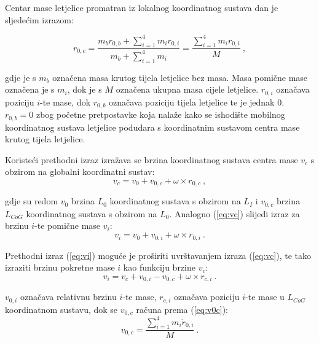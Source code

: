 \documentclass[11pt,a4paper]{article}
\begin{document}
\medskip

Centar mase letjelice promatran iz lokalnog koordinatnog sustava dan je sljedećim izrazom:

\begin{equation}
 {r}_{0,c} = \frac{ {m}_{b} {r}_{0,b} + \sum_{i=1}^{4}{m}_{i} {r}_{0,i}}{{m}_{b} + \sum_{i=1}^{4} {m}_{i}} = \frac{\sum_{i=1}^{4} {m}_{i} {r}_{0,i}}{ {M}} \ , 
\label{eq:r0c}
\end{equation}

\medskip

gdje je s $m_{b}$ označena masa krutog tijela letjelice bez masa. Masa pomične mase označena je s $m_{i}$, dok je s $M$ označena ukupna masa cijele letjelice. $r_{0,i}$ označava poziciju $i$-te mase, dok $r_{0,b}$ označava poziciju tijela letjelice te je jednak 0. $r_{0,b} = 0$ zbog početne pretpostavke koja nalaže kako se ishodište mobilnog koordinatnog sustava letjelice podudara s koordinatnim sustavom centra mase krutog tijela letjelice. 

\medskip

Koristeći prethodni izraz izražava se brzina koordinatnog sustava centra mase $v_{c}$ s obzirom na globalni koordinatni sustav:
\begin{equation}
 {v_{c} = v_{0} + v_{0,c} + \omega \times r_{0,c}} \ , 
\label{eq:vc}
\end{equation}

gdje su redom $v_{0}$ brzina $L_{0}$ koordinatnog sustava s obzirom na $L_{I}$ i $v_{0,c}$ brzina $L_{CoG}$ koordinatnog sustava s obzirom na $L_{0}$. Analogno (\ref{eq:vc}) slijedi izraz za brzinu $i$-te pomične mase $v_{i}$:
\begin{equation}
 {v_{i} = v_{0} + v_{0,i} + \omega \times r_{0,i}} \ . 
\label{eq:vi}
\end{equation}

Prethodni izraz (\ref{eq:vi}) moguće je proširiti uvrštavanjem izraza (\ref{eq:vc}), te tako izraziti brzinu pokretne mase $i$ kao funkciju brzine $v_{c}$: 
\begin{equation}
 {v_{i} = v_{c} + v_{0,i} - v_{0,c} + \omega \times r_{c,i}} \ .
\label{eq:vi2}
\end{equation}

$v_{0,i}$ označava relativnu brzinu $i$-te mase, $r_{c,i}$ označava poziciju $i$-te mase u $L_{CoG}$ koordinatnom sustavu, dok se $v_{0,c}$ računa prema (\ref{eq:v0c}):
\begin{equation}
 {v_{0,c} = \frac{\sum_{i=1}^{4}m_{i}\dot{r}_{0,i}}{M}} \ .
\label{eq:v0c}
\end{equation}
\end{document}
